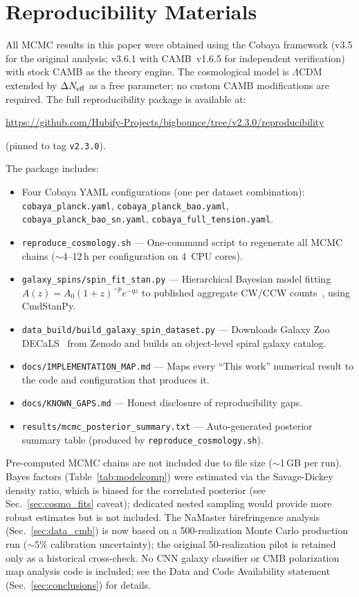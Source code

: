 \documentclass[aps,prd,twocolumn,superscriptaddress,showpacs,preprintnumbers,nofootinbib,longbibliography,floatfix]{revtex4-2}
\newcommand{\Neff}{N_{\rm eff}}
\begin{document}
\section{Reproducibility Materials}\label{app:reproducibility}

All MCMC results in this paper were obtained using the Cobaya framework (v3.5 for the original analysis; v3.6.1 with CAMB~v1.6.5 for independent verification)~\cite{Cobaya2021} with stock CAMB as the theory engine. The cosmological model is $\Lambda$CDM extended by $\Delta\Neff$ as a free parameter; no custom CAMB modifications are required. The full reproducibility package is available at:

\begin{center}
\url{https://github.com/Hubify-Projects/bigbounce/tree/v2.3.0/reproducibility}
\end{center}
\noindent (pinned to tag \texttt{v2.3.0}).

\noindent The package includes:
\begin{itemize}[leftmargin=*]
\item Four Cobaya YAML configurations (one per dataset combination): \texttt{cobaya\_planck.yaml}, \texttt{cobaya\_planck\_bao.yaml}, \texttt{cobaya\_planck\_bao\_sn.yaml}, \texttt{cobaya\_full\_tension.yaml}.
\item \texttt{reproduce\_cosmology.sh} --- One-command script to regenerate all MCMC chains ($\sim$4--12\,h per configuration on 4~CPU cores).
\item \texttt{galaxy\_spins/spin\_fit\_stan.py} --- Hierarchical Bayesian model fitting $A(z) = A_0(1+z)^{-p}e^{-qz}$ to published aggregate CW/CCW counts~\cite{Shamir2024}, using CmdStanPy.
\item \texttt{data\_build/build\_galaxy\_spin\_dataset.py} --- Downloads Galaxy Zoo DECaLS~\cite{Walmsley2022} from Zenodo and builds an object-level spiral galaxy catalog.
\item \texttt{docs/IMPLEMENTATION\_MAP.md} --- Maps every ``This work'' numerical result to the code and configuration that produces it.
\item \texttt{docs/KNOWN\_GAPS.md} --- Honest disclosure of reproducibility gaps.
\item \texttt{results/mcmc\_posterior\_summary.txt} --- Auto-generated posterior summary table (produced by \texttt{reproduce\_cosmology.sh}).
\end{itemize}

\noindent Pre-computed MCMC chains are not included due to file size ($\sim$1\,GB per run). Bayes factors (Table~\ref{tab:modelcomp}) were estimated via the Savage-Dickey density ratio, which is biased for the correlated posterior (see Sec.~\ref{sec:cosmo_fits} caveat); dedicated nested sampling would provide more robust estimates but is not included. The NaMaster birefringence analysis (Sec.~\ref{sec:data_cmb}) is now based on a 500-realization Monte Carlo production run (${\sim}5\%$ calibration uncertainty); the original 50-realization pilot is retained only as a historical cross-check. No CNN galaxy classifier or CMB polarization map analysis code is included; see the Data and Code Availability statement (Sec.~\ref{sec:conclusions}) for details.
\end{document}
